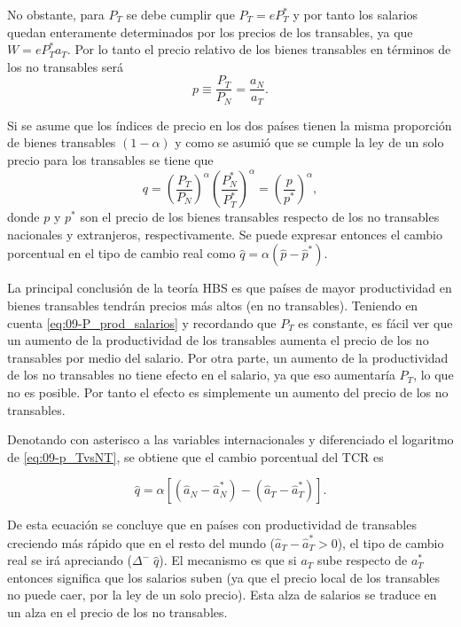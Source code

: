 \documentclass[DeGregorioResumen]{subfiles}
\begin{document}
No obstante, para $P_T$ se debe cumplir que $P_T=eP^*_T$ y por tanto los salarios quedan enteramente determinados por los precios de los transables, ya que $W=eP^*_Ta_T$. Por lo tanto el precio relativo de los bienes transables en términos de los no transables será
\begin{equation}
	p \equiv \frac{P_T}{P_N} = \frac{a_N}{a_T}.
	\label{eq:09-p_TvsNT}
\end{equation}

Si se asume que los índices de precio en los dos países tienen la misma proporción de bienes transables $(1-\alpha)$ y como se asumió que se cumple la ley de un solo precio para los transables se tiene que
\[
	q = \left(\frac{P_T}{P_N}\right)^\alpha \left(\frac{P_N^*}{P_T^*}\right)^\alpha = \left(\frac{p}{p^*}\right)^\alpha,
\]
donde $p$ y $p^*$ son el precio de los bienes transables respecto de los no transables nacionales y extranjeros, respectivamente. Se puede expresar entonces el cambio porcentual en el tipo de cambio real como $\hat q = \alpha(\hat p - \hat p^*)$.

La principal conclusión de la teoría HBS es que países de mayor productividad en bienes transables tendrán precios más altos (en no transables). Teniendo en cuenta \eqref{eq:09-P_prod_salarios} y recordando que $P_T$ es constante, es fácil ver que un aumento de la productividad de los transables aumenta el precio de los no transables por medio del salario. Por otra parte, un aumento de la productividad de los no transables no tiene efecto en el salario, ya que eso aumentaría $P_T$, lo que no es posible. Por tanto el efecto es simplemente un aumento del precio de los no transables.

Denotando con asterisco a las variables internacionales y diferenciado el logaritmo de \eqref{eq:09-p_TvsNT}, se obtiene que el cambio porcentual del TCR es

\begin{equation}
\hat q = \alpha[(\hat a_N - \hat a_N^*)-(\hat a_T - \hat a_T^*)].
\label{eq:09-TCR_log}
\end{equation}

De esta ecuación se concluye que en países con productividad de transables creciendo más rápido que en el resto del mundo ($\hat a_T - \hat a_T^*>0$), el tipo de cambio real se irá apreciando ($\Delta^-\;\hat q$). El mecanismo es que si $a_T$ sube respecto de $a_T^*$ entonces significa que los salarios suben  (ya que el precio local de los transables no puede caer, por la ley de un solo precio). Esta alza de salarios se traduce en un alza en el precio de los no transables.
\end{document}
